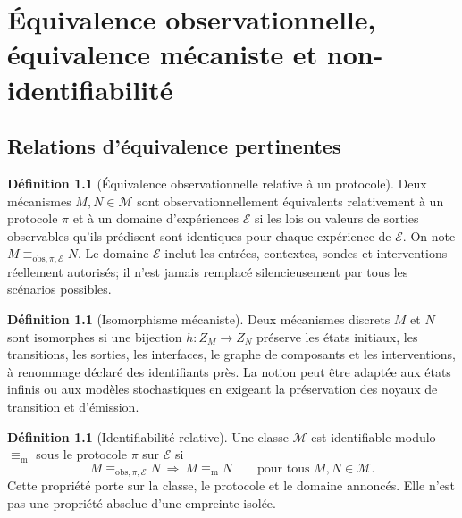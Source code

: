 \documentclass[11pt,oneside]{book}
\theoremstyle{definition}
\newtheorem{definition}[theoreme]{Définition}
\theoremstyle{remark}
\newcommand{\Mcal}{\mathcal M}
\newcommand{\1}{\mathbf 1}
\newcommand{\MechEq}{\equiv_{\mathrm m}}
\begin{document}
\chapter{Équivalence observationnelle, équivalence mécaniste et non-identifiabilité}
\section{Relations d'équivalence pertinentes}
\begin{definition}[Équivalence observationnelle relative à un protocole]
Deux mécanismes $M,N\in\Mcal$ sont observationnellement équivalents relativement à un protocole $\pi$ et à un domaine d'expériences $\mathcal E$ si les lois ou valeurs de sorties observables qu'ils prédisent sont identiques pour chaque expérience de $\mathcal E$. On note $M\equiv_{\mathrm{obs},\pi,\mathcal E}N$. Le domaine $\mathcal E$ inclut les entrées, contextes, sondes et interventions réellement autorisés; il n'est jamais remplacé silencieusement par tous les scénarios possibles.
\end{definition}

\begin{definition}[Isomorphisme mécaniste]
Deux mécanismes discrets $M$ et $N$ sont isomorphes si une bijection $h:Z_M\to Z_N$ préserve les états initiaux, les transitions, les sorties, les interfaces, le graphe de composants et les interventions, à renommage déclaré des identifiants près. La notion peut être adaptée aux états infinis ou aux modèles stochastiques en exigeant la préservation des noyaux de transition et d'émission.
\end{definition}

\begin{definition}[Identifiabilité relative]
Une classe $\Mcal$ est identifiable modulo $\MechEq$ sous le protocole $\pi$ sur $\mathcal E$ si
\[
M\equiv_{\mathrm{obs},\pi,\mathcal E}N\ \Longrightarrow\ M\MechEq N
\qquad\text{pour tous }M,N\in\Mcal.
\]
Cette propriété porte sur la classe, le protocole et le domaine annoncés. Elle n'est pas une propriété absolue d'une empreinte isolée.
\end{definition}
\end{document}
